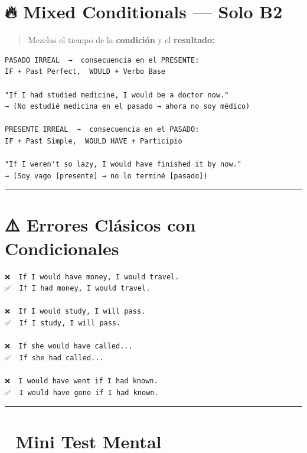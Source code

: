 \documentclass[
  spanish,
  letterpaper,
]{scrbook}
\begin{document}
\section{🔥 Mixed Conditionals --- Solo
B2}\label{mixed-conditionals-solo-b2}

\begin{quote}
Mezclas el tiempo de la \textbf{condición} y el \textbf{resultado:}
\end{quote}

\begin{verbatim}
PASADO IRREAL  →  consecuencia en el PRESENTE:
IF + Past Perfect,  WOULD + Verbo Base

"If I had studied medicine, I would be a doctor now."
→ (No estudié medicina en el pasado → ahora no soy médico)

PRESENTE IRREAL  →  consecuencia en el PASADO:
IF + Past Simple,  WOULD HAVE + Participio

"If I weren't so lazy, I would have finished it by now."
→ (Soy vago [presente] → no lo terminé [pasado])
\end{verbatim}

\begin{center}\rule{0.5\linewidth}{0.5pt}\end{center}

\section{⚠️ Errores Clásicos con
Condicionales}\label{errores-cluxe1sicos-con-condicionales}

\begin{verbatim}
❌  If I would have money, I would travel.
✅  If I had money, I would travel.

❌  If I would study, I will pass.
✅  If I study, I will pass.

❌  If she would have called...
✅  If she had called...

❌  I would have went if I had known.
✅  I would have gone if I had known.
\end{verbatim}

\begin{center}\rule{0.5\linewidth}{0.5pt}\end{center}

\section{📝 Mini Test Mental}\label{mini-test-mental}
\end{document}
